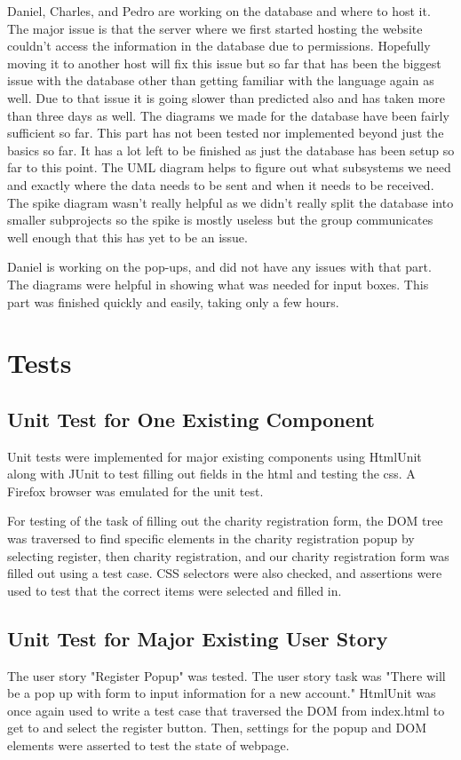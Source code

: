 \documentclass[12pt]{article}
\begin{document}
	Daniel, Charles, and Pedro are working on the database and where to host it.
	The major issue is that the server where we first started hosting the
	website couldn't access the information in the database due to permissions.
	Hopefully moving it to another host will fix this issue but so far that has been
	the biggest issue with the database other than getting familiar with the
	language again as well. Due to that issue it is going slower than predicted also
	and has taken more than three days as well. The diagrams we made for the
	database have been fairly sufficient so far. This part has not been tested nor
	implemented beyond just the basics so far. It has a lot left to be finished as
	just the database has been setup so far to this point. The UML diagram helps to
	figure out what subsystems we need and exactly where the data needs to be sent
	and when it needs to be received. The spike diagram wasn't really helpful as
	we didn't really split the database into smaller subprojects so the spike is
	mostly useless but the group communicates well enough that this has yet to be
	an issue.

	Daniel is working on the pop-ups, and did not have any issues with that part. The
	diagrams were helpful in showing what was needed for input boxes. This part was
	finished quickly and easily, taking only a few hours.
\section{Tests}
\subsection{Unit Test for One Existing Component}
	Unit tests were implemented for major existing components using HtmlUnit
	along with JUnit to test filling out fields in the html and testing the css. A
	Firefox browser was emulated for the unit test.

	For testing of the task of filling out the charity registration form,
	the DOM tree was traversed to find specific elements in the charity
	registration popup by selecting register, then charity registration, and
	our charity registration form was filled out using a test case. CSS selectors
	were also checked, and assertions were used to test that the correct items were
	selected and filled in.
\subsection{Unit Test for Major Existing User Story}
	The user story "Register Popup" was tested. The user story task was "There
	will be a pop up with form to input information for a new account." HtmlUnit
	was once again used to write a test case that traversed the DOM from index.html
	to get to and select the register button. Then, settings for the popup and DOM
	elements were asserted to test the state of webpage.
\end{document}
